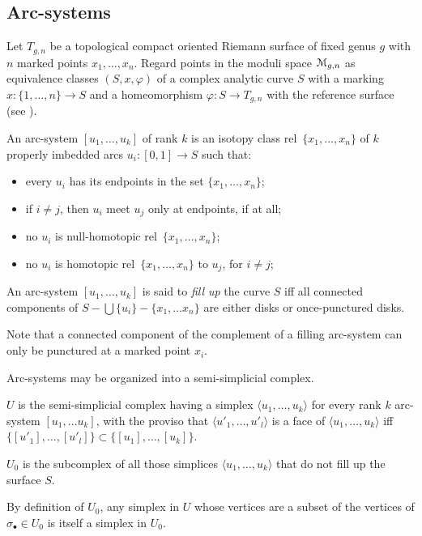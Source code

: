 \subsection{Arc-systems}
\label{sec:arc-systems}

Let $T_{g,n}$ be a topological compact oriented Riemann surface of
fixed genus $g$ with $n$ marked points $x_1, \ldots, x_n$.  Regard points
in the moduli space $\mathcal{M}_{g,n}$ as equivalence classes $(S,x,\varphi)$ of a
complex analytic curve $S$ with a marking $x:\{1,\ldots,n\}\to S$ and a
homeomorphism $\varphi:S\to T_{g,n}$ with the reference surface (see
).

\begin{definition}
  An arc-system $[u_1, \ldots, u_k]$ of rank $k$ is an isotopy class
  rel~$\{x_1, \ldots, x_n\}$ of $k$ properly imbedded arcs $u_i : [0,1] \to S$
  such that:
  \begin{itemize}
  \item every $u_i$ has its endpoints in the set $\{x_1, \ldots, x_n\}$;
  \item if $i \neq j$, then $u_i$ meet $u_j$ only at endpoints, if at all;
  \item no $u_i$ is null-homotopic rel~$\{x_1, \ldots, x_n\}$;
  \item no $u_i$ is homotopic rel~$\{x_1, \ldots, x_n\}$ to $u_j$, for $i \neq
    j$;
  \end{itemize}
  An arc-system $[u_1, \ldots, u_k]$ is said to \emph{fill up} the curve
  $S$ iff all connected components of $S - \bigcup\{u_i\} - \{x_1,\ldots x_n\}$ are
  either disks or once-punctured disks.
\end{definition}
Note that a connected component of the complement of a filling
arc-system can only be punctured at a marked point $x_i$.

Arc-systems may be organized into a semi-simplicial complex.
\begin{definition}
  $U$ is the semi-simplicial complex having a simplex $\langle u_1, \ldots, u_k\rangle$
  for every rank $k$ arc-system $[u_1, \ldots u_k]$, with the proviso that
  $\langle u'_1, \ldots, u'_l\rangle$ is a face of $\langle u_1, \ldots, u_k\rangle$ iff $\{ [u'_1], \ldots,
  [u'_l] \} \subset \{ [u_1], \ldots, [u_k] \}$.
  
  $U_0$ is the subcomplex of all those simplices $\langle u_1, \ldots, u_k\rangle$
  that do not fill up the surface $S$.
\end{definition}
By definition of $U_0$, any simplex in $U$ whose vertices are a subset
of the vertices of $\sigma_\bullet \in U_0$ is itself a simplex in $U_0$.


